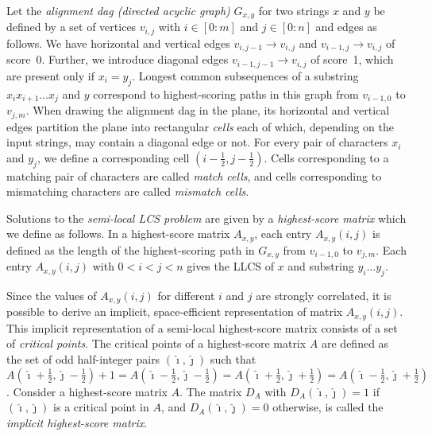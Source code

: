 \documentclass{IOS-Book-Article}     \usepackage{amsmath}
\theoremstyle{plain}
\theoremstyle{definition}
\begin{document}
Let the \textit{alignment dag (directed acyclic graph)} $G_{x,y}$ for two strings $x$
and $y$ be defined by a set of vertices $v_{i,j}$ with
$i \in [0:m]$ and $j \in [0:n]$ and edges as follows.
We have horizontal and vertical edges $v_{i, j-1} \rightarrow v_{i, j}$ and
$v_{i-1, j} \rightarrow v_{i, j}$ of score~0. Further, we introduce diagonal edges
$v_{i-1, j-1} \rightarrow v_{i, j}$ of score~1, which are present only if
$x_i = y_j$.
Longest common subsequences of a substring $x_i x_{i+1} \ldots x_{j}$ and $y$
correspond to highest-scoring paths in this graph from $v_{i-1,0}$ to $v_{j,m}$.
When drawing the 
alignment dag in the plane, its horizontal and vertical
edges partition the plane into rectangular \textit{cells} each of which,
depending on the input strings, may contain a diagonal edge or not. For every pair of
characters $x_i$ and $y_j$, we define a corresponding cell
$(i-\frac{1}{2}, j-\frac{1}{2})$. Cells corresponding to a matching pair of
characters are called \textit{match cells}, and cells corresponding to
mismatching characters are called \textit{mismatch cells}.

Solutions to the \textit{semi-local LCS problem} are given by a
\textit{highest-score matrix} which we define as follows.
In a highest-score matrix $A_{x,y}$, each entry $A_{x,y}(i,j)$ is defined as
the length of the highest-scoring path in $G_{x,y}$ from $v_{i-1,0}$ to $v_{j,m}$.
Each entry $A_{x,y}(i,j)$ with $0 < i < j < n$ gives the LLCS
of $x$ and substring $y_i \ldots y_j$. 


Since the values of
$A_{x,y}(i,j)$ for different $i$ and $j$ are strongly correlated, it is possible to derive an implicit, space-efficient representation
of matrix $A_{x,y}(i,j)$. This implicit representation of a semi-local highest-score
matrix consists of a set of \textit{critical points}.
The critical points of a highest-score matrix $A$ are defined as the set of odd
half-integer pairs $(\hat{\imath}, \hat{\jmath})$ such that
$A(\hat{\imath}+\frac{1}{2},\hat{\jmath}-\frac{1}{2}) + 1 =
 A(\hat{\imath}-\frac{1}{2},\hat{\jmath}-\frac{1}{2}) =
 A(\hat{\imath}+\frac{1}{2},\hat{\jmath}+\frac{1}{2}) =
 A(\hat{\imath}-\frac{1}{2},\hat{\jmath}+\frac{1}{2})
 $.
Consider a highest-score matrix $A$. The matrix $D_A$ with $D_A(\hat{\imath},
\hat{\jmath}) = 1$ if $(\hat{\imath},\hat{\jmath})$ is a critical point in $A$, 
and $D_A(\hat{\imath},\hat{\jmath}) = 0$ otherwise, is called the 
\textit{implicit highest-score matrix}.
\end{document}
